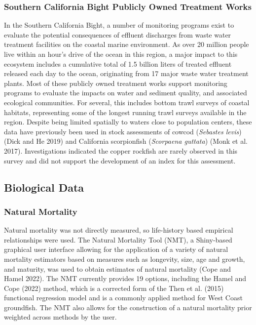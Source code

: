 \documentclass[11pt,
  english,
  letterpaper,
]{article}
\begin{document}
\hypertarget{southern-california-bight-publicly-owned-treatment-works}{%
\subsubsection{Southern California Bight Publicly Owned Treatment Works}\label{southern-california-bight-publicly-owned-treatment-works}}

In the Southern California Bight, a number of monitoring programs exist to evaluate the potential consequences of effluent discharges from waste water treatment facilities on the coastal marine environment. As over 20 million people live within an hour's drive of the ocean in this region, a major impact to this ecosystem includes a cumulative total of 1.5 billion liters of treated effluent released each day to the ocean, originating from 17 major waste water treatment plants. Most of these publicly owned treatment works support monitoring programs to evaluate the impacts on water and sediment quality, and associated ecological communities. For several, this includes bottom trawl surveys of coastal habitats, representing some of the longest running trawl surveys available in the region. Despite being limited spatially to waters close to population centers, these data have previously been used in stock assessments of cowcod (\emph{Sebastes levis}) (Dick and He 2019) and California scorpionfish (\emph{Scorpaena guttata}) (Monk et al. 2017). Investigations indicated the copper rockfish are rarely observed in this survey and did not support the development of an index for this assessment.

\hypertarget{biological-data}{%
\subsection{Biological Data}\label{biological-data}}

\hypertarget{natural-mortality}{%
\subsubsection{Natural Mortality}\label{natural-mortality}}

Natural mortality was not directly measured, so life-history based empirical relationships were used. The Natural Mortality Tool (NMT), a Shiny-based graphical user interface allowing for the application of a variety of natural mortality estimators based on measures such as longevity, size, age and growth, and maturity, was used to obtain estimates of natural mortality (Cope and Hamel 2022). The NMT currently provides 19 options, including the Hamel and Cope (2022) method, which is a corrected form of the Then et al. (2015) functional regression model and is a commonly applied method for West Coast groundfish. The NMT also allows for the construction of a natural mortality prior weighted across methods by the user.
\end{document}
